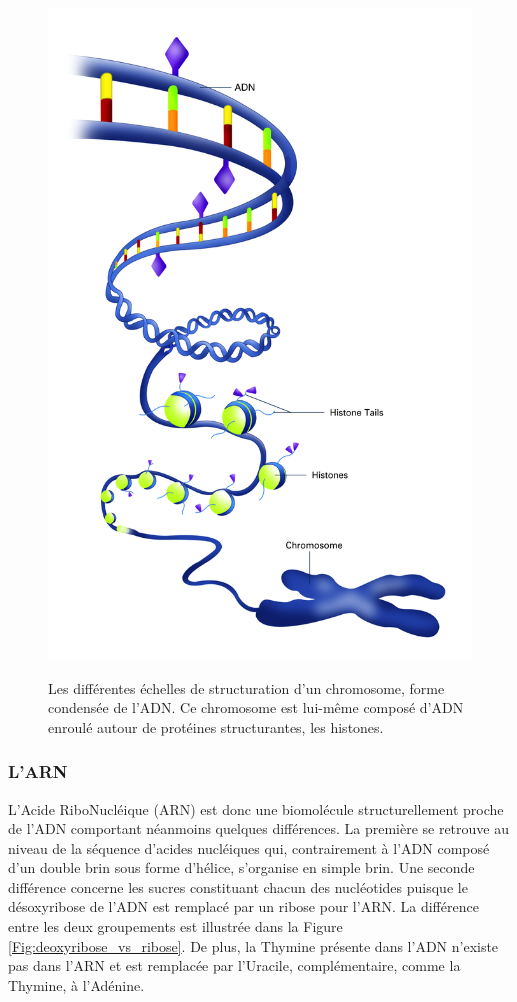 \begin{figure}
 \centering
 {\includegraphics[width=0.6\linewidth]{./figures/ch1/chromosome_adn_2}}
   \caption{Les différentes échelles de structuration d'un chromosome, forme condensée de l'ADN. Ce chromosome est lui-même composé d'ADN enroulé autour de protéines structurantes, les histones.}
   \label{Fig:chromosome_adn}
  \hspace{0.3cm}
\end{figure}


\subsubsection{L'ARN}

L'Acide RiboNucléique (ARN) est donc une biomolécule structurellement proche de l'ADN comportant néanmoins quelques différences. La première se retrouve au niveau de la séquence d'acides nucléiques qui, contrairement à l'ADN composé d'un double brin sous forme d'hélice, s'organise en simple brin. Une seconde différence concerne les sucres constituant chacun des nucléotides puisque le désoxyribose de l'ADN est remplacé par un ribose pour l'ARN. La différence entre les deux groupements est illustrée dans la Figure \ref{Fig:deoxyribose_vs_ribose}. De plus, la Thymine présente dans l'ADN n'existe pas dans l'ARN et est remplacée par l'Uracile, complémentaire, comme la Thymine, à l'Adénine.


